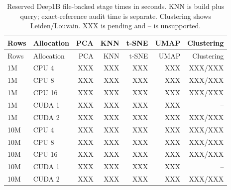 \documentclass[article]{jss}
\begin{document}
{\scriptsize
\setlength{\tabcolsep}{3pt}
\begin{longtable}{llrrrrr}
\caption{Reserved Deep1B file-backed stage times in seconds. KNN is
  build plus query; exact-reference audit time is separate. Clustering
  shows Leiden/Louvain. XXX is pending and -- is unsupported.}
\label{tab:pending-deep-stages}\\
\toprule
Rows & Allocation & PCA & KNN & t-SNE & UMAP & Clustering \\
\midrule
\endfirsthead
\toprule
Rows & Allocation & PCA & KNN & t-SNE & UMAP & Clustering \\
\midrule
\endhead
1M & CPU 4 & XXX & XXX & XXX & XXX & XXX/XXX \\
1M & CPU 8 & XXX & XXX & XXX & XXX & XXX/XXX \\
1M & CPU 16 & XXX & XXX & XXX & XXX & XXX/XXX \\
1M & CUDA 1 & XXX & XXX & XXX & XXX & -- \\
1M & CUDA 2 & XXX & XXX & XXX & XXX & XXX/XXX \\
10M & CPU 4 & XXX & XXX & XXX & XXX & XXX/XXX \\
10M & CPU 8 & XXX & XXX & XXX & XXX & XXX/XXX \\
10M & CPU 16 & XXX & XXX & XXX & XXX & XXX/XXX \\
10M & CUDA 1 & XXX & XXX & XXX & XXX & -- \\
10M & CUDA 2 & XXX & XXX & XXX & XXX & XXX/XXX \\
\bottomrule
\end{longtable}
}
\end{document}
